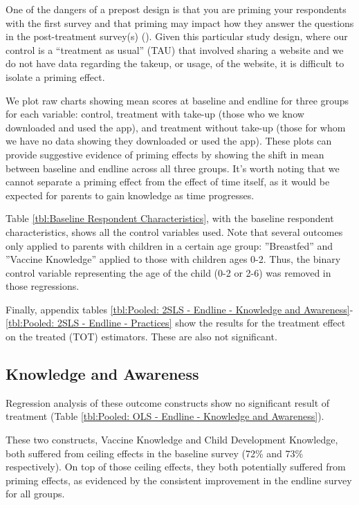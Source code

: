 One of the dangers of a prepost design is that you are priming your respondents with the first survey and that priming may impact how they answer the questions in the post-treatment survey(s) (\cite{Stantcheva2023}). Given this particular study design, where our control is a ``treatment as usual'' (TAU) that involved sharing a website and we do not have data regarding the takeup, or usage, of the website, it is difficult to isolate a priming effect.

We plot raw charts showing mean scores at baseline and endline for three groups for each variable: control, treatment with take-up (those who we know downloaded and used the app), and treatment without take-up (those for whom we have no data showing they downloaded or used the app). These plots can provide suggestive evidence of priming effects by showing the shift in mean between baseline and endline across all three groups. It’s worth noting that we cannot separate a priming effect from the effect of time itself, as it would be expected for parents to gain knowledge as time progresses.

Table \ref{tbl:Baseline Respondent Characteristics}, with the baseline respondent characteristics, shows all the control variables used. Note that several outcomes only applied to parents with children in a certain age group: ”Breastfed” and ”Vaccine Knowledge” applied to those with children ages 0-2. Thus, the binary control variable representing the age of the child (0-2 or 2-6) was removed in those regressions.

Finally, appendix tables \ref{tbl:Pooled: 2SLS - Endline - Knowledge and Awareness}-\ref{tbl:Pooled: 2SLS - Endline - Practices} show the results for the treatment effect on the treated (TOT) estimators. These are also not significant.


\subsection{Knowledge and Awareness}

Regression analysis of these outcome constructs show no significant result of treatment (Table \ref{tbl:Pooled: OLS - Endline - Knowledge and Awareness}).



These two constructs, Vaccine Knowledge and Child Development Knowledge, both suffered from ceiling effects in the baseline survey (72\% and 73\% respectively). On top of those ceiling effects, they both potentially suffered from priming effects, as evidenced by the consistent improvement in the endline survey for all groups.

